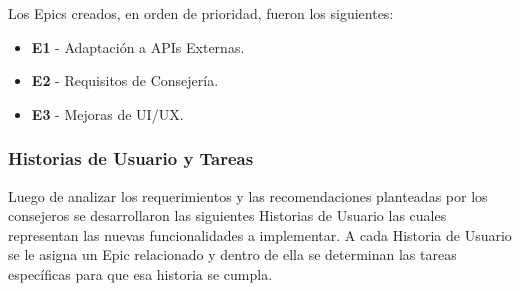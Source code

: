 Los Epics creados, en orden de prioridad, fueron los siguientes:
\begin{itemize}
    \item \textbf{E1} - Adaptación a APIs Externas.
    \item \textbf{E2} - Requisitos de Consejería.
    \item \textbf{E3} - Mejoras de UI/UX.
\end{itemize}

\subsubsection{Historias de Usuario y Tareas}
Luego de analizar los requerimientos y las recomendaciones planteadas por los consejeros se desarrollaron las siguientes Historias de Usuario las cuales representan las nuevas funcionalidades a implementar. A cada Historia de Usuario se le asigna un Epic relacionado y dentro de ella se determinan las tareas específicas para que esa historia se cumpla.

